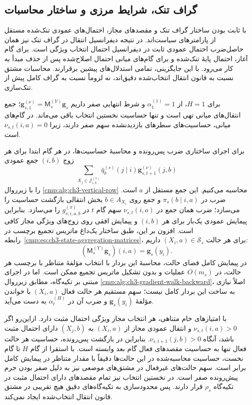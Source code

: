 \subsection{گراف تنک، شرایط مرزی و ساختار محاسبات}
\label{app:ch3-gradient-walk-sparse}

با ثابت بودن ساختار گراف تنک و مقصدهای مجاز،
احتمال‌های عمودی تنک‌شده مستقل از پارامترهای
سیاست‌اند. در نتیجه دیفرانسیل انتقال در
گراف تنک نیز همان حاصل‌ضرب احتمال عمودی ثابت
در دیفرانسیل احتمال انتخاب ویژگی است.
برای گام آغاز، احتمال پایهٔ تنک‌شده و برای
گام‌های میانی احتمال اصلاح‌شده پس از حذف
مبدأ به کار می‌رود. با این جایگزینی، تمامی
استدلال‌های پیشین برقرارند. محاسبات مشتق نسبت
به قانون انتقال انتخاب‌شده دقیق‌اند، نه
لزوماً نسبت به گراف کامل پیش از تنک‌سازی.

برای $H=1$، از
$\alpha_1^{(1)}=1$ و شرط انتهایی صفر داریم
$\mathbf g_{s,1}^{(\nu)}
=\mathsf M_s^{(Y)}\mathbf g_s$؛
جمع انتقال‌های میانی تهی است و تنها حساسیت
نخستین انتخاب باقی می‌ماند. در گام‌های
میانی، حساسیت‌های سطرهای بازدیدنشده سهم
صفر دارند، زیرا $\nu_{s,t}(i,a)=0$ است.

برای اجرای ساختاری ضرب پس‌رونده و محاسبهٔ
حساسیت‌ها، در هر گام ابتدا برای هر زوج
$(i,b)$ جمع عمودی
\[
\sum_{X_j\in\mathcal J_{i,b}^{(s)}}
\bar q_b^{(s)}(j\mid i)
\mathbf g_{s,t+1}^{(\nu)}(j,b)
\]
را با زیرروال
\ref{cmp:alg:ch3-vertical-row}
محاسبه می‌کنیم. این جمع مستقل از $a$ است.
ضرب در $\pi_s(b\mid i,a)$ و جمع روی
$b\in A_{X_i}$ بخش انتقالی بازگشت حساسیت
را می‌سازد؛ ضرب همان جمع در
$\nu_{s,t}(i,a)$ سهم گام $t$ در
$g_{s;i,a,b}^{(\pi)}$ را می‌سازد.
بنابراین پیمایش عمودی یک‌بار برای هر
$(i,b)$ و پیمایش افقی روی زوج‌های ویژگی
مجاز کافی است. افزون بر این، طبق ساختار
یک‌داغ ماتریس تجمیع برچسب در
رابطه~\eqref{cmp:eq:ch3-state-aggregation-matrices}،
برای هر حالت $(X_i,a)\in\mathcal S_s$ داریم:
\[
(\mathsf M_s^{(Y)}\mathbf g_s)(i,a)
=\mathbf g_s(y_i).
\]
در پیمایش کامل فضای حالت، محاسبهٔ این بردار
با انتخاب مؤلفهٔ متناظر با برچسب هر حالت،
در $O(m_s)$ عملیات و بدون تشکیل ماتریس
تجمیع ممکن است. اما در اجرای مبتنی بر
تکیه‌گاه، مطابق زیرروال
\ref{cmp:alg:ch3-gradient-walk-backward}،
اصلاً نیازی به ساخت این بردار کامل نیست؛
سهم مستقیم هر حالت فعال $(X_i,a)$ با
خواندن مؤلفهٔ $\mathbf g_s(y_i)$ و ضرب آن
در $\alpha_t^{(H)}$ به دست می‌آید.

با امتیازهای خام متناهی، هر انتخاب مجاز
ویژگی احتمال مثبت دارد. ازاین‌رو اگر
$\nu_{s,t}(i,a)>0$ و انتقال عمودی مجاز
از $(X_i,a)$ به $(X_j,b)$ دارای احتمال
مثبت باشد، آنگاه $\nu_{s,t+1}(j,b)>0$.
بنابراین در بازگشت پس‌رونده، حساسیت هر
حالت فعال تنها به حساسیت مقصدهای فعال
گام بعد وابسته است. با استقرا از گام
$H$ تا گام نخست، حساسیت محاسبه‌شده در
این حالت‌ها دقیقاً با مقدار متناظر در
پیمایش کامل برابر است. سهم حالت‌های
غیرفعال در مشتق‌های موضعی نیز به دلیل
صفر بودن جرم پیش‌رونده صفر است.
در نخستین انتخاب نیز تمام مقصدهای دارای
احتمال مثبت در تکیه‌گاه $\rho_s$ قرار دارند.
پس محدودسازی به تکیه‌گاه‌های دقیق هیچ
تقریبی در مشتق قانون انتقال انتخاب‌شده
ایجاد نمی‌کند.

